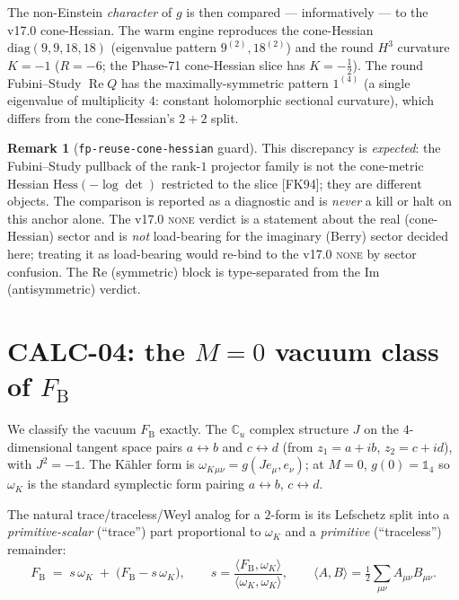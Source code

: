 \documentclass[11pt]{article}
\renewcommand{\Re}{\operatorname{Re}}
\newcommand{\Cu}{\mathbb{C}_u}
\newcommand{\FB}{F_{\mathrm{B}}}
\theoremstyle{plain}
\theoremstyle{definition}
\newtheorem{remark}{Remark}
\begin{document}
The non-Einstein \emph{character} of $g$ is then compared --- informatively --- to the
v17.0 cone-Hessian. The warm engine reproduces the cone-Hessian
$\mathrm{diag}(9,9,18,18)$ (eigenvalue pattern $9^{(2)},18^{(2)}$) and the round $H^3$
curvature $K=-1$ ($R=-6$; the Phase-71 cone-Hessian slice has $K=-\tfrac12$). The
round Fubini--Study $\Re Q$ has the maximally-symmetric pattern $1^{(4)}$ (a single
eigenvalue of multiplicity $4$: constant holomorphic sectional curvature), which
differs from the cone-Hessian's $2+2$ split.

\begin{remark}[\texttt{fp-reuse-cone-hessian} guard]
\label{rem:fpcone}
This discrepancy is \emph{expected}: the Fubini--Study pullback of the rank-$1$
projector family is not the cone-metric Hessian $\mathrm{Hess}(-\log\det)$ restricted
to the slice [FK94]; they are different objects. The comparison is reported as a
diagnostic and is \emph{never} a kill or halt on this anchor alone. The v17.0
\textsc{none} verdict is a statement about the real (cone-Hessian) sector and is
\emph{not} load-bearing for the imaginary (Berry) sector decided here; treating it as
load-bearing would re-bind to the v17.0 \textsc{none} by sector confusion. The Re
(symmetric) block is type-separated from the Im (antisymmetric) verdict.
\end{remark}

\section{CALC-04: the $M=0$ vacuum class of $\FB$}
\label{sec:calc04}

We classify the vacuum $\FB$ exactly. The $\Cu$ complex structure $J$ on the
$4$-dimensional tangent space pairs $a\leftrightarrow b$ and $c\leftrightarrow d$
(from $z_1=a+ib$, $z_2=c+id$), with $J^2=-\mathbb{1}$. The K\"ahler form is
$\omega_K{}_{\mu\nu}=g(J e_\mu,e_\nu)$; at $M=0$, $g(0)=\mathbb{1}_4$ so $\omega_K$ is
the standard symplectic form pairing $a\leftrightarrow b$, $c\leftrightarrow d$.

The natural trace/traceless/Weyl analog for a $2$-form is its Lefschetz split into a
\emph{primitive-scalar} (``trace'') part proportional to $\omega_K$ and a
\emph{primitive} (``traceless'') remainder:
\begin{equation}
  \FB \;=\; s\,\omega_K \;+\; \big(\FB - s\,\omega_K\big),
  \qquad
  s=\frac{\langle \FB,\omega_K\rangle}{\langle \omega_K,\omega_K\rangle},
  \qquad
  \langle A,B\rangle=\tfrac12\textstyle\sum_{\mu\nu}A_{\mu\nu}B_{\mu\nu}.
\end{equation}
\end{document}
